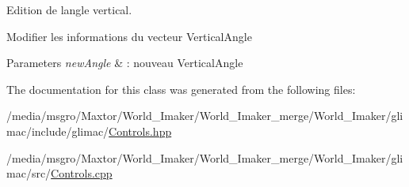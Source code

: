 Edition de l\textquotesingle{}angle vertical. 

Modifier les informations du vecteur Vertical\+Angle


\begin{DoxyParams}{Parameters}
{\em new\+Angle} & \+: nouveau Vertical\+Angle \\
\hline
\end{DoxyParams}


The documentation for this class was generated from the following files\+:\begin{DoxyCompactItemize}
\item 
/media/msgro/\+Maxtor/\+World\+\_\+\+Imaker/\+World\+\_\+\+Imaker\+\_\+merge/\+World\+\_\+\+Imaker/glimac/include/glimac/\hyperlink{Controls_8hpp}{Controls.\+hpp}\item 
/media/msgro/\+Maxtor/\+World\+\_\+\+Imaker/\+World\+\_\+\+Imaker\+\_\+merge/\+World\+\_\+\+Imaker/glimac/src/\hyperlink{Controls_8cpp}{Controls.\+cpp}\end{DoxyCompactItemize}
